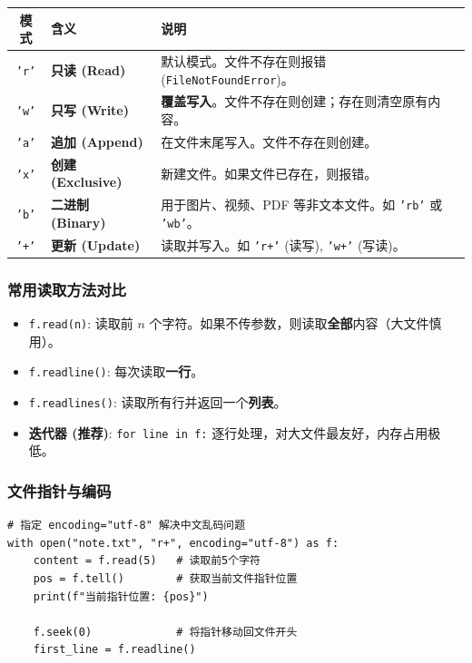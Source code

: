 \documentclass{article}
\begin{document}
\begin{table}[h]
\centering
\begin{tabular}{|c|l|l|}
\hline
\textbf{模式} & \textbf{含义} & \textbf{说明} \\ \hline
\texttt{'r'} & \textbf{只读 (Read)} & 默认模式。文件不存在则报错 (\texttt{FileNotFoundError})。 \\ \hline
\texttt{'w'} & \textbf{只写 (Write)} & \textbf{覆盖写入}。文件不存在则创建；存在则清空原有内容。 \\ \hline
\texttt{'a'} & \textbf{追加 (Append)} & 在文件末尾写入。文件不存在则创建。 \\ \hline
\texttt{'x'} & \textbf{创建 (Exclusive)} & 新建文件。如果文件已存在，则报错。 \\ \hline
\texttt{'b'} & \textbf{二进制 (Binary)} & 用于图片、视频、PDF 等非文本文件。如 \texttt{'rb'} 或 \texttt{'wb'}。 \\ \hline
\texttt{'+'} & \textbf{更新 (Update)} & 读取并写入。如 \texttt{'r+'} (读写), \texttt{'w+'} (写读)。 \\ \hline
\end{tabular}
\end{table}

\subsubsection{常用读取方法对比}



\begin{itemize}
    \item \texttt{f.read(n)}: 读取前 $n$ 个字符。如果不传参数，则读取\textbf{全部}内容（大文件慎用）。
    \item \texttt{f.readline()}: 每次读取\textbf{一行}。
    \item \texttt{f.readlines()}: 读取所有行并返回一个\textbf{列表}。
    \item \textbf{迭代器 (推荐)}: \texttt{for line in f:} 逐行处理，对大文件最友好，内存占用极低。
\end{itemize}

\subsubsection{文件指针与编码}

\begin{lstlisting}[caption=指针控制与编码示例]
# 指定 encoding="utf-8" 解决中文乱码问题
with open("note.txt", "r+", encoding="utf-8") as f:
    content = f.read(5)   # 读取前5个字符
    pos = f.tell()        # 获取当前文件指针位置
    print(f"当前指针位置: {pos}")
    
    f.seek(0)             # 将指针移动回文件开头
    first_line = f.readline()
\end{lstlisting}
\end{document}

